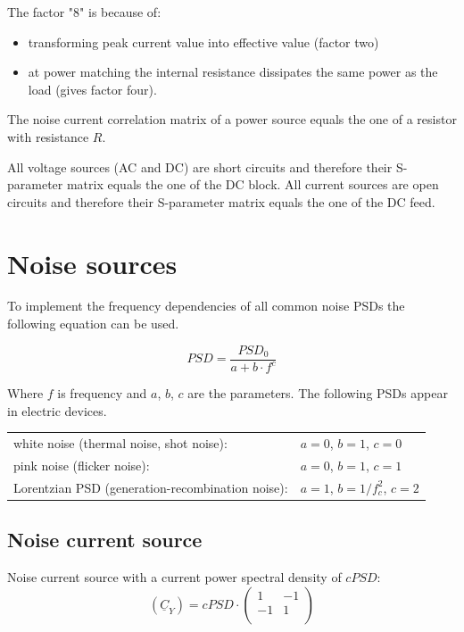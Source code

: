 The factor "8" is because of:
\begin{itemize}
\item transforming peak current value into effective value (factor two)
\item at power matching the internal resistance dissipates the same power
      as the load (gives factor four).
\end{itemize}

The noise current correlation matrix of a power source equals the
one of a resistor with resistance $R$.

\addvspace{12pt}

All voltage sources (AC and DC) are short circuits and therefore their
S-parameter matrix equals the one of the DC block.  All current
sources are open circuits and therefore their S-parameter matrix
equals the one of the DC feed.


\section{Noise sources}

To implement the frequency dependencies of all common noise PSDs the
following equation can be used.

\begin{equation}
PSD = \frac{PSD_0}{a+b\cdot f^c}
\end{equation}

Where $f$ is frequency and $a$, $b$, $c$ are the parameters.  The
following PSDs appear in electric devices.

\addvspace{12pt}

\begin{tabular}{ll}
white noise (thermal noise, shot noise):         & $a=0$, $b=1$, $c=0$ \\
pink noise (flicker noise):                      & $a=0$, $b=1$, $c=1$ \\
Lorentzian PSD (generation-recombination noise): & $a=1$, $b=1/f_c^2$, $c=2$ \\
\end{tabular}


\subsection{Noise current source}

Noise current source with a current power spectral density of $cPSD$:
\begin{equation}
(\underline{C}_Y) = cPSD \cdot
\begin{pmatrix}
 1 & -1 \\
-1 &  1 \\
\end{pmatrix}
\end{equation}

